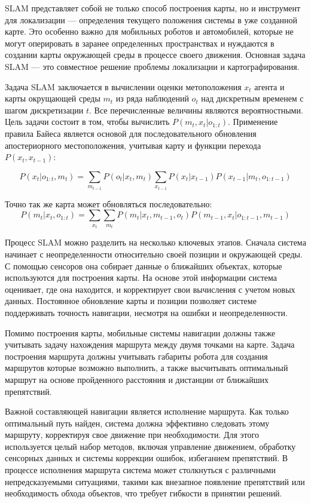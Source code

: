 SLAM представляет собой не только способ построения карты, но и инструмент для
локализации — определения текущего положения системы в уже созданной карте. Это
особенно важно для мобильных роботов и автомобилей, которые не могут оперировать
в заранее определенных пространствах и нуждаются в создании карты окружающей
среды в процессе своего движения. Основная задача SLAM — это совместное решение
проблемы локализации и картографирования.


Задача SLAM заключается в вычислении оценки метоположения $x_t$ агента и карты
окрущающей среды $m_t$ из ряда наблюдений $o_t$ над дискретным временем с шагом
дискретизации $t$. Все перечисленные величины являются вероятностными. Цель
задачи состоит в том, чтобы вычислить $P(m_t, x_t | o_{1:t})$. Применение правила
Байеса является основой для последовательного обновления апостериорного
местоположения, учитывая карту и функции перехода~$P(x_t, x_{t-1})$:

\begin{equation}
P(x_t | o_{1:t}, m_t) = \sum_{m_{t-1}} P(o_t | x_t, m_t) \sum_{x_{t-1}} P(x_t |
	x_{t-1}) P(x_{t-1} | m_t, o_{1:t-1})
\end{equation}

Точно так же карта может обновляться последовательно:
\begin{equation}
P(m_t | x_t, o_{1:t}) = \sum_{x_t} \sum_{m_t} P(m_t | x_t, m_{t-1}, o_t)
	P(m_{t-1}, x_t | o_{1:t-1}, m_{t-1})
\end{equation}

Процесс SLAM можно разделить на несколько ключевых этапов. Сначала система
начинает с неопределенности относительно своей позиции и окружающей среды. С
помощью сенсоров она собирает данные о ближайших объектах, которые используются
для построения карты. На основе этой информации система оценивает, где она
находится, и корректирует свои вычисления с учетом новых данных. Постоянное
обновление карты и позиции позволяет системе поддерживать точность навигации,
несмотря на ошибки и неопределенности.

Помимо построения карты, мобильные системы навигации должны также учитывать
задачу нахождения маршрута между двумя точками на карте. Задача построения
маршрута должны учитывать габариты робота для создания маршрутов которые
возможно выполнить, а также высчитывать оптимальный маршрут на основе
пройденного расстояния и дистанции от ближайших препятствий.

Важной составляющей навигации является исполнение маршрута. Как только
оптимальный путь найден, система должна эффективно следовать этому маршруту,
корректируя свое движение при необходимости. Для этого используется целый набор
методов, включая управление движением, обработку сенсорных данных и системы
коррекции ошибок, избеганием препятствий. В процессе исполнения маршрута система
может столкнуться с различными непредсказуемыми ситуациями, такими как внезапное
появление препятствий или необходимость обхода объектов, что требует гибкости в
принятии решений.


